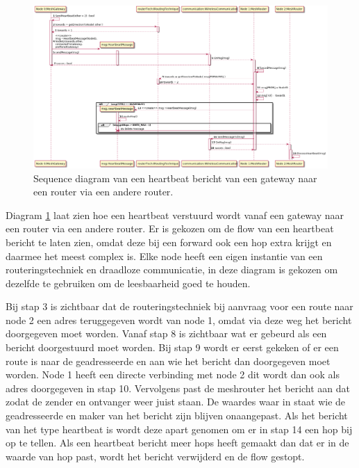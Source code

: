 \documentclass[a4paper, 11pt, oneside]{report}
\begin{document}
\begin{figure}[H]
	\begin{center}\includegraphics[width=\linewidth]{UML/out/Communication/Sequence/ForwardHeartbeat/ForwardHeartbeat.png}\end{center}
	\caption{Sequence diagram van een heartbeat bericht van een gateway naar een router via een andere router.}
	\label{fig:communication:sequence:sequence:heartbeatgateway->router->router}
\end{figure}
Diagram \ref{fig:communication:sequence:sequence:heartbeatgateway->router->router} laat zien hoe een heartbeat verstuurd wordt vanaf een gateway naar een router via een andere router.
Er is gekozen om de flow van een heartbeat bericht te laten zien, omdat deze bij een forward ook een hop extra krijgt en daarmee het meest complex is.
Elke node heeft een eigen instantie van een routeringstechniek en draadloze communicatie, in deze diagram is gekozen om dezelfde te gebruiken om de leesbaarheid goed te houden.

Bij stap 3 is zichtbaar dat de routeringstechniek bij aanvraag voor een route naar node 2 een adres teruggegeven wordt van node 1, omdat via deze weg het bericht doorgegeven moet worden.
Vanaf stap 8 is zichtbaar wat er gebeurd als een bericht doorgestuurd moet worden.
Bij stap 9 wordt er eerst gekeken of er een route is naar de geadresseerde en aan wie het bericht dan doorgegeven moet worden.
Node 1 heeft een directe verbinding met node 2 dit wordt dan ook als adres doorgegeven in stap 10.
Vervolgens past de meshrouter het bericht aan dat zodat de zender en ontvanger weer juist staan. 
De waardes waar in staat wie de geadresseerde en maker van het bericht zijn blijven onaangepast.
Als het bericht van het type heartbeat is wordt deze apart genomen om er in stap 14 een hop bij op te tellen.
Als een heartbeat bericht meer hops heeft gemaakt dan dat er in de waarde van hop past, wordt het bericht verwijderd en de flow gestopt.
\end{document}

